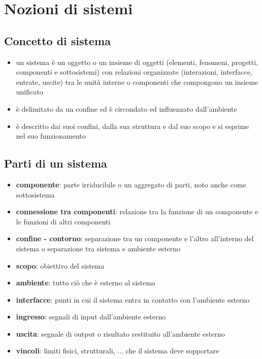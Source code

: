 \documentclass[a4paper]{article}
\begin{document}
\newpage

\section{Nozioni di sistemi}
\subsection{Concetto di sistema}
\begin{itemize}
	\item un sistema è un oggetto o un insieme di oggetti (elementi, fenomeni, progetti, componenti e sottosistemi) con relazioni
	organizzate (interazioni, interfacce, entrate, uscite) tra le unità interne o componenti che compongono un insieme unificato
	\item è delimitato da un confine ed è circondato ed influenzato dall'ambiente
	\item è descritto dai suoi confini, dalla sua struttura e dal suo scopo e si esprime nel suo funzionamento
\end{itemize}

\subsection{Parti di un sistema}
\begin{itemize}
	\item \textbf{componente}: parte irriducibile o un aggregato di parti, noto anche come sottosistema
	\item \textbf{connessione tra componenti}: relazione tra la funzione di un componente e le funzioni di altri componenti
	\item \textbf{confine - contorno}: separazione tra un componente e l'altro all'interno del sistema o separazione tra sistema
	e ambiente esterno
	\item \textbf{scopo}: obiettivo del sistema
	\item \textbf{ambiente}: tutto ciò che è esterno al sistema
	\item \textbf{interfacce}: punti in cui il sistema entra in contatto con l'ambiente esterno
	\item \textbf{ingresso}: segnali di input dall'ambiente esterno
	\item \textbf{uscita}: segnale di output o risultato restituito all'ambiente esterno
	\item \textbf{vincoli}: limiti fisici, strutturali, ... che il sistema deve sopportare
\end{itemize}
\end{document}
